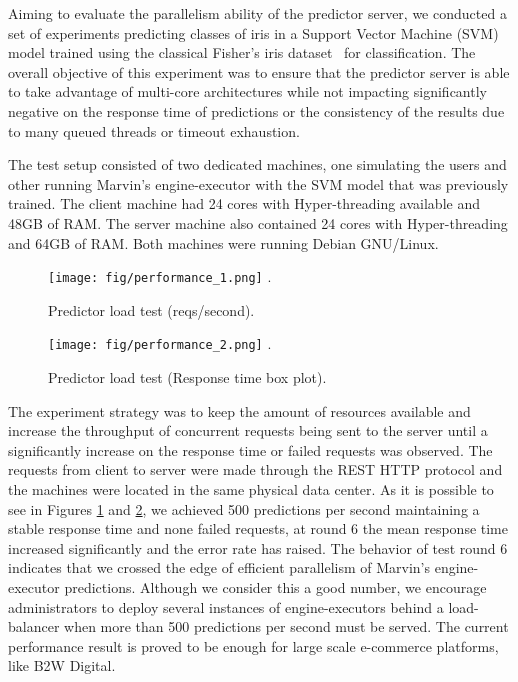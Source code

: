 \documentclass[twoside,11pt]{article}
\begin{document}
Aiming to evaluate the parallelism ability of the predictor server, we conducted a set of experiments predicting classes of iris in a Support Vector Machine (SVM)~\citep{hearst1998support} model trained using the classical Fisher's iris dataset~\citep{fisher1936use} for classification. The overall objective of this experiment was to ensure that the predictor server is able to take advantage of multi-core architectures while not impacting significantly negative on the response time of predictions or the consistency of the results due to many queued threads or timeout exhaustion.

The test setup consisted of two dedicated machines, one simulating the users and other running Marvin's engine-executor with the SVM model that was previously trained. The client machine had 24 cores with Hyper-threading available and 48GB of RAM. The server machine also contained 24 cores with Hyper-threading and 64GB of RAM. Both machines were running Debian GNU/Linux.

\begin{figure}[h]
\centering
\texttt{[image: fig/performance\_1.png]}
\DeclareGraphicsExtensions.
\caption{Predictor load test (reqs/second).}
\label{fig_load}
\end{figure}

\begin{figure}[h]
\centering
\texttt{[image: fig/performance\_2.png]}
\DeclareGraphicsExtensions.
\caption{Predictor load test (Response time box plot).}
\label{fig_load_2}
\end{figure}

The experiment strategy was to keep the amount of resources available and increase the throughput of concurrent requests being sent to the server until a significantly increase on the response time or failed requests was observed. The requests from client to server were made through the REST HTTP protocol and the machines were located in the same physical data center. As it is possible to see in Figures \ref{fig_load} and \ref{fig_load_2}, we achieved 500 predictions per second maintaining a stable response time and none failed requests, at round 6 the mean response time increased significantly and the error rate has raised. The behavior of test round 6 indicates that we crossed the edge of efficient parallelism of Marvin's engine-executor predictions. Although we consider this a good number, we encourage administrators to deploy several instances of engine-executors behind a load-balancer when more than 500 predictions per second must be served. The current performance result is proved to be enough for large scale e-commerce platforms, like B2W Digital.
\end{document}
